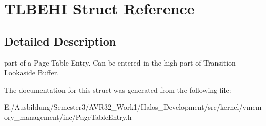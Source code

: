 \hypertarget{struct_t_l_b_e_h_i}{
\section{TLBEHI Struct Reference}
\label{struct_t_l_b_e_h_i}
}


\subsection{Detailed Description}
part of a Page Table Entry. Can be entered in the high part of Transition Lookaside Buffer. 

The documentation for this struct was generated from the following file:\begin{CompactItemize}
\item 
E:/Ausbildung/Semester3/AVR32\_\-Work1/Halos\_\-Development/src/kernel/vmemory\_\-management/inc/PageTableEntry.h\end{CompactItemize}
